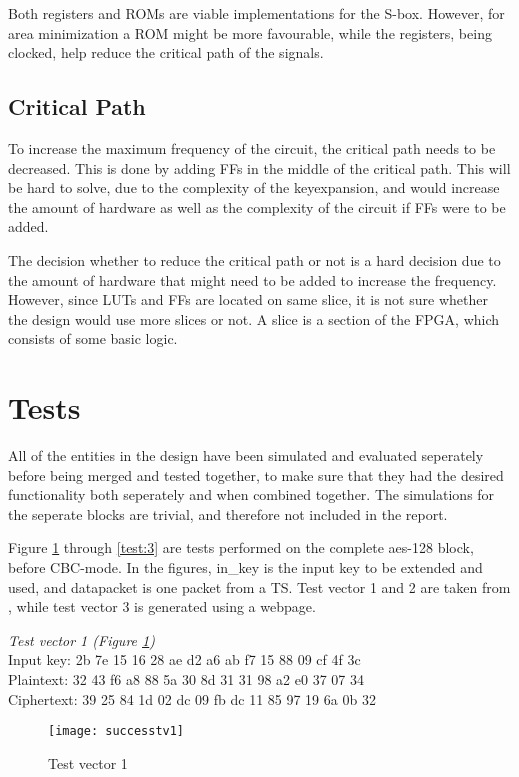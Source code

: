 Both registers and ROMs are viable implementations for the S-box. 
However, for area minimization a ROM might be more favourable, while 
the registers, being clocked, help reduce the critical path of the 
signals.

\subsection{Critical Path}\label{sec:c_path}
To increase the maximum frequency of the circuit, the critical path 
needs to be decreased. This is done by adding FFs in the middle of the 
critical path. This will be hard to solve, due to the complexity of 
the keyexpansion, and would increase the amount of hardware as well as 
the complexity of the circuit if FFs were to be added.

The decision whether to reduce the critical path or not is a hard 
decision due to the amount of hardware that might need to be added to
increase the frequency. However, since LUTs and FFs are located on 
same slice, it is not sure whether the design would use more slices or 
not. A slice is a section of the FPGA, which consists of some basic 
logic.

\section{Tests}
All of the entities in the design have been simulated and evaluated 
seperately before being merged and tested together, to make sure that 
they had the desired functionality both seperately and when combined 
together. The simulations for the seperate blocks are trivial, and 
therefore not included in the report.

Figure \ref{test:1} through \ref{test:3} are tests performed on the 
complete aes-128 block, before CBC-mode. In the figures, in\_key is the 
input key to be extended and used, and datapacket is one packet from a 
TS. Test vector 1 and 2 are taken from \citep{AES:2001}, while test 
vector 3 is generated using a webpage.

\emph{Test vector 1 (Figure \ref{test:1})}\\
Input key: 2b 7e 15 16 28 ae d2 a6 ab f7 15 88 09 cf 4f 3c\\
Plaintext: 32 43 f6 a8 88 5a 30 8d 31 31 98 a2 e0 37 07 34\\
Ciphertext: 39 25 84 1d 02 dc 09 fb dc 11 85 97 19 6a 0b 32

\begin{figure}
  \texttt{[image: successtv1]}
  \caption{Test vector 1}
  \label{test:1}
\end{figure}

